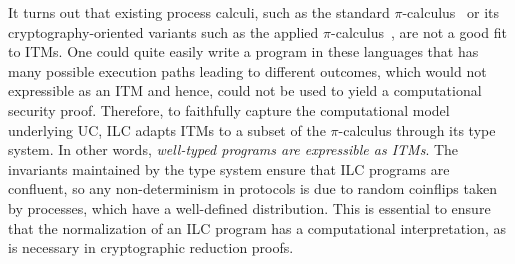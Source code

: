 It turns out that existing process calculi, such as the standard
$\pi$-calculus~\cite{milner1999communicating} or its cryptography-oriented
variants such as the applied $\pi$-calculus~\cite{abadi2001mobile}, are not a good
fit to ITMs. One could quite easily write a program in these languages that has
many possible execution paths leading to different outcomes, which would not
expressible as an ITM and hence, could not be used to yield a computational
security proof. Therefore, to faithfully capture the computational model
underlying UC, ILC adapts ITMs to a subset of the $\pi$-calculus through its type
system. In other words, \emph{well-typed programs are expressible as ITMs}. The
invariants maintained by the type system ensure that ILC programs are confluent,
so any non-determinism in protocols is due to random coinflips taken by
processes, which have a well-defined distribution. This is essential to ensure
that the normalization of an ILC program has a computational interpretation, as
is necessary in cryptographic reduction proofs.

